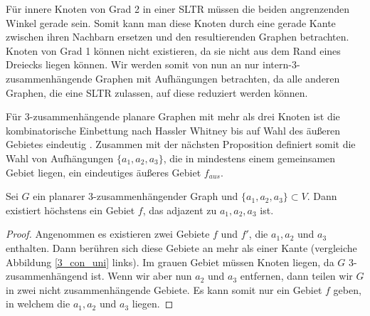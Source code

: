 \begin{remark}
Für innere Knoten von Grad 2 in einer SLTR müssen die beiden angrenzenden Winkel gerade sein. Somit kann man diese Knoten durch eine gerade Kante zwischen ihren Nachbarn ersetzen und den resultierenden Graphen betrachten. Knoten von Grad 1 können nicht existieren, da sie nicht aus dem Rand eines Dreiecks liegen können. Wir werden somit von nun an nur intern-3-zusammenhängende Graphen mit Aufhängungen betrachten, da alle anderen Graphen, die eine SLTR zulassen, auf diese reduziert werden können.
\end{remark}

Für 3-zusammenhängende planare Graphen mit mehr als drei Knoten ist die kombinatorische Einbettung nach Hassler Whitney bis auf Wahl des äußeren Gebietes eindeutig \cite{whitney32}. Zusammen mit der nächsten Proposition definiert somit die Wahl von Aufhängungen $\{a_1,a_2,a_3\}$, die in mindestens einem gemeinsamen Gebiet liegen, ein eindeutiges äußeres Gebiet $f_{aus}$.

\begin{proposition}
Sei $G$ ein planarer 3-zusammenhängender Graph und $\{a_1,a_2,a_3\} \subset V$. Dann existiert höchstens ein Gebiet $f$, das adjazent zu $a_1,a_2,a_3$ ist.
\end{proposition}

\begin{proof}
Angenommen es existieren zwei Gebiete $f$ und $f'$, die $a_1,a_2$ und $a_3$ enthalten. Dann berühren sich diese Gebiete an mehr als einer Kante (vergleiche Abbildung \ref{3_con_uni} links). Im grauen Gebiet müssen Knoten liegen, da $G$ 3-zusammenhängend ist. Wenn wir aber nun $a_2$ und $a_3$ entfernen, dann teilen wir $G$ in zwei nicht zusammenhängende Gebiete. Es kann somit nur ein Gebiet $f$ geben, in welchem die $a_1,a_2$ und $a_3$ liegen.
\end{proof}


